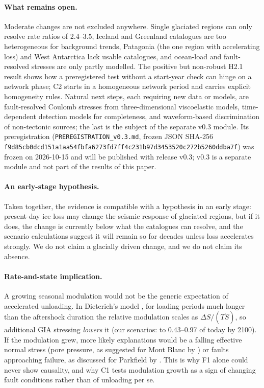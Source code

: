 \documentclass[11pt,a4paper]{article}
\begin{document}
\paragraph{What remains open.}
Moderate changes are not excluded anywhere. Single glaciated regions can only resolve rate ratios of 2.4--3.5, Iceland and Greenland catalogues are too heterogeneous for background trends, Patagonia (the one region with accelerating loss) and West Antarctica lack usable catalogues, and ocean-load and fault-resolved stresses are only partly modelled. The positive but non-robust H2.1 result shows how a preregistered test without a start-year check can hinge on a network phase; C2 starts in a homogeneous network period and carries explicit homogeneity rules. Natural next steps, each requiring new data or models, are fault-resolved Coulomb stresses from three-dimensional viscoelastic models, time-dependent detection models for completeness, and waveform-based discrimination of non-tectonic sources; the last is the subject of the separate v0.3 module. Its preregistration (\texttt{PREREGISTRATION\_v0.3.md}, frozen JSON SHA-256 \texttt{f9d85cb0dcd151a1aa54fbfa6273fd7ff4c231b97d3453520c272b5260ddba7f}) was frozen on 2026-10-15 and will be published with release v0.3; v0.3 is a separate module and not part of the results of this paper.

\paragraph{An early-stage hypothesis.}
Taken together, the evidence is compatible with a hypothesis in an early stage: present-day ice loss may change the seismic response of glaciated regions, but if it does, the change is currently below what the catalogues can resolve, and the scenario calculations suggest it will remain so for decades unless loss accelerates strongly. We do not claim a glacially driven change, and we do not claim its absence.

\paragraph{Rate-and-state implication.}
A growing seasonal modulation would not be the generic expectation of accelerated unloading. In Dieterich's model \parencite{dieterich1994}, for loading periods much longer than the aftershock duration the relative modulation scales as $\Delta S/(T\dot S)$, so additional GIA stressing \emph{lowers} it (our scenarios: to 0.43--0.97 of today by 2100). If the modulation grew, more likely explanations would be a falling effective normal stress (pore pressure, as suggested for Mont Blanc by \cite{simon2025}) or faults approaching failure, as discussed for Parkfield by \textcite{sirorattanakul2026}. This is why F1 alone could never show causality, and why C1 tests modulation growth as a sign of changing fault conditions rather than of unloading per se.
\end{document}
